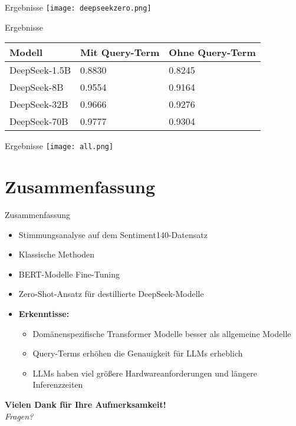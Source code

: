 \documentclass[aspectratio=169]{beamer} %
\begin{document}
\begin{frame}{Ergebnisse}
    \centering
    \texttt{[image: deepseekzero.png]}
\end{frame}

\begin{frame}{Ergebnisse}
    \centering
    \scriptsize
    \begin{tabular}{|l|l|l|}
        \hline
        \textbf{Modell} & \textbf{Mit Query-Term} & \textbf{Ohne Query-Term} \\
        \hline
        DeepSeek-1.5B & 0.8830 & 0.8245 \\
        DeepSeek-8B   & 0.9554 & 0.9164 \\
        DeepSeek-32B  & 0.9666 & 0.9276 \\
        DeepSeek-70B  & 0.9777 & 0.9304 \\
        \hline
    \end{tabular}
\end{frame}

\begin{frame}{Ergebnisse}
    \centering
    \texttt{[image: all.png]}
\end{frame}

\section{Zusammenfassung}

\begin{frame}{Zusammenfassung}
  \normalsize
  \begin{itemize}
      \item Stimmungsanalyse auf dem Sentiment140-Datensatz
      \item Klassische Methoden
      \item BERT-Modelle Fine-Tuning
      \item Zero-Shot-Ansatz für destillierte DeepSeek-Modelle
      \pause
      \item \textbf{Erkenntisse:}
      \begin{itemize}
          \item Domänenspezifische Transformer Modelle besser als allgemeine Modelle
          \item Query-Terms erhöhen die Genauigkeit für LLMs erheblich
          \item LLMs haben viel größere Hardwareanforderungen und längere Inferenzzeiten
      \end{itemize}
  \end{itemize}

  \vspace{0.5cm}
  \centering
  \pause
  {\large \textbf{Vielen Dank für Ihre Aufmerksamkeit!}} \\[0.1cm]
  \textit{Fragen?}
\end{frame}
\end{document}
